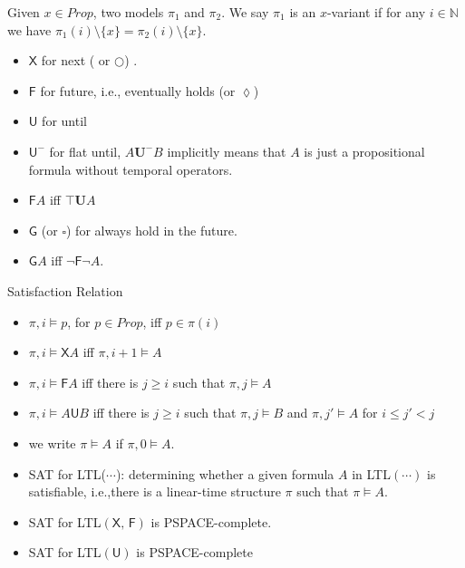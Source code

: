 \documentclass[12pt]{article}
\begin{document}
\begin{CJK*}{GBK}{song}
Given $x\in Prop$, two models $\pi_1$ and $\pi_2$. We say $\pi_1$ is an $x$-variant if for any $i\in\mathbb{N}$ we have $\pi_1(i)\setminus\{x\}=\pi_2(i)\setminus\{x\}$.

\begin{itemize}
\item $\textsf{X}$ for next ( or $\bigcirc$) .
\item $\textsf{F}$ for future, i.e., eventually holds (or $\lozenge$)
\item $\textsf{U}$ for until
\item $\textsf{U}^-$ for flat until, $A\mathbf{U}^-B$ implicitly means that $A$ is just a propositional formula without temporal operators.

\item $\textsf{F}A$ iff $\top\mathbf{U}A$

\item $\textsf{G}$ (or $\square$) for always hold in the future.
\item $\textsf{G}A$ iff $\neg \textsf{F}\neg A$.
\end{itemize}

Satisfaction Relation
\begin{itemize}
\item $\pi, i\models p$, for $p\in Prop$, iff $p\in \pi(i)$
 \item $\pi, i\models \textsf{X}A$ iff $\pi,i+1\models A$
 \item $\pi,i\models \textsf{F}A$ iff there is $j\geq i$ such that $\pi,j\models A$
 \item $\pi,i\models A\textsf{U} B$ iff there is $j\geq i$ such that $\pi,j\models B$ and $\pi,j'\models A$ for $i\leq j'<j$
\item we write $\pi\models A$ if $\pi,0\models A$.

\item SAT for LTL($\cdots$): determining whether a given formula $A$ in LTL$(\cdots)$ is satisfiable, i.e.,there is a linear-time structure $\pi$ such that $\pi\models A$.

\end{itemize}





\begin{itemize}
\item SAT for LTL$(\textsf{X, F})$ is PSPACE-complete.

\item SAT for LTL$(\textsf{U})$ is PSPACE-complete


\end{itemize}
\end{CJK*}
\end{document}
